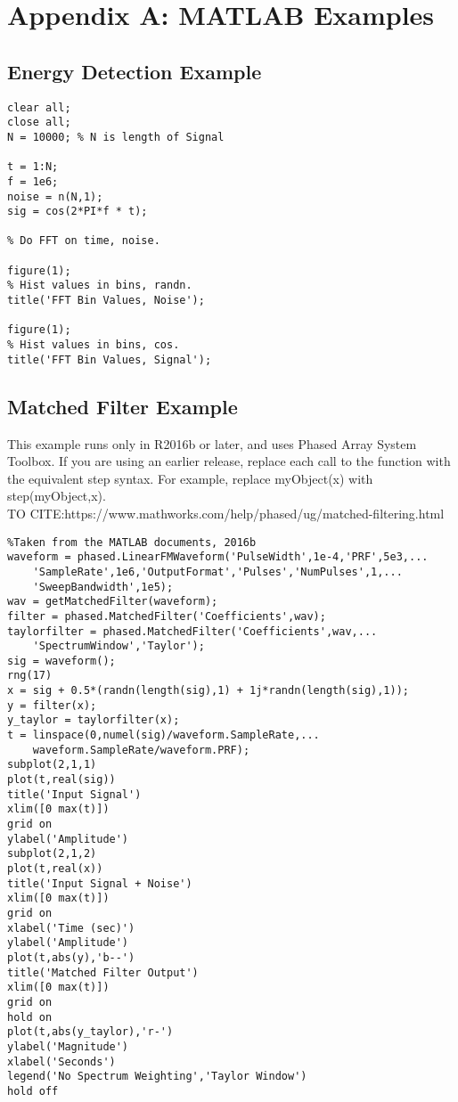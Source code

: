 \appendix
\chapter{Appendix A: MATLAB Examples}
\section{Energy Detection Example}
\begin{verbatim}
clear all;
close all;
N = 10000; % N is length of Signal 

t = 1:N;
f = 1e6;
noise = n(N,1);
sig = cos(2*PI*f * t);

% Do FFT on time, noise.

figure(1);
% Hist values in bins, randn.
title('FFT Bin Values, Noise');

figure(1);
% Hist values in bins, cos.
title('FFT Bin Values, Signal');
\end{verbatim}
\section{Matched Filter Example}
This example runs only in R2016b or later, and uses Phased Array System Toolbox. If you are using an earlier release, replace each call to the function with the equivalent step syntax. For example, replace myObject(x) with step(myObject,x).\\
TO CITE:https://www.mathworks.com/help/phased/ug/matched-filtering.html
\begin{verbatim}
%Taken from the MATLAB documents, 2016b
waveform = phased.LinearFMWaveform('PulseWidth',1e-4,'PRF',5e3,...
    'SampleRate',1e6,'OutputFormat','Pulses','NumPulses',1,...
    'SweepBandwidth',1e5);
wav = getMatchedFilter(waveform);
filter = phased.MatchedFilter('Coefficients',wav);
taylorfilter = phased.MatchedFilter('Coefficients',wav,...
    'SpectrumWindow','Taylor');
sig = waveform();
rng(17)
x = sig + 0.5*(randn(length(sig),1) + 1j*randn(length(sig),1));
y = filter(x);
y_taylor = taylorfilter(x);
t = linspace(0,numel(sig)/waveform.SampleRate,...
    waveform.SampleRate/waveform.PRF);
subplot(2,1,1)
plot(t,real(sig))
title('Input Signal')
xlim([0 max(t)])
grid on
ylabel('Amplitude')
subplot(2,1,2)
plot(t,real(x))
title('Input Signal + Noise')
xlim([0 max(t)])
grid on
xlabel('Time (sec)')
ylabel('Amplitude')
plot(t,abs(y),'b--')
title('Matched Filter Output')
xlim([0 max(t)])
grid on
hold on
plot(t,abs(y_taylor),'r-')
ylabel('Magnitude')
xlabel('Seconds')
legend('No Spectrum Weighting','Taylor Window')
hold off
\end{verbatim}